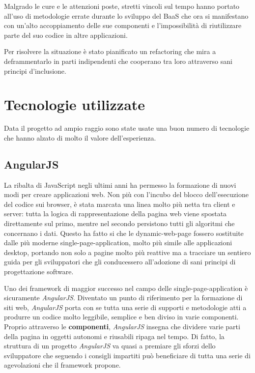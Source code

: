 Malgrado le cure e le attenzioni poste, stretti vincoli sul tempo hanno portato
all'uso di metodologie errate durante lo sviluppo del \gls{BaaS} che ora si
manifestano con un'alto accoppiamento delle sue componenti e l'impossibilità
di riutilizzare parte del suo codice in altre applicazioni.

Per risolvere la situazione è stato pianificato un \gls{refactoring} che mira
a deframmentarlo in parti indipendenti che cooperano tra loro attraverso
sani principi d'inclusione.

\section{Tecnologie utilizzate}
\label{sec:tecnologie}
Data il progetto ad ampio raggio sono state usate una buon numero di tecnologie
che hanno alzato di molto il valore dell'esperienza.

\subsection{AngularJS}
La ribalta di JavaScript negli ultimi anni ha permesso la formazione di
nuovi modi per creare applicazioni web. Non più con l'incubo del blocco
dell'esecuzione del codice sui browser, è stata marcata una linea molto più
netta tra client e server: tutta la logica di rappresentazione della pagina web
viene spostata direttamente sul primo, mentre nel secondo persistono tutti
gli algoritmi che concernano i dati. Questo ha fatto si che le
\gls{dynamic-web-page} fossero sostituite dalle più moderne
\gls{single-page-application}, molto più simile alle applicazioni desktop,
portando non solo a pagine molto più reattive ma a tracciare un sentiero guida
per gli sviluppatori che gli conducessero all'adozione di sani principi di
progettazione software.

Uno dei framework di maggior successo nel campo delle
\gls{single-page-application} è sicuramente \textit{AngularJS}. Diventato un
punto di riferimento per la formazione di siti web, \textit{AngularJS} porta
con se tutta una serie di supporti e metodologie atti a produrre un codice molto
leggibile, semplice e ben diviso in varie componenti. Proprio attraverso le
\textbf{componenti}, \textit{AngularJS} insegna che dividere varie parti della
pagina in oggetti autonomi e riusabili ripaga nel tempo. Di fatto, la struttura
di un progetto \textit{AngularJS} va quasi a premiare gli sforzi dello
sviluppatore che seguendo i consigli impartiti può beneficiare di tutta una
serie di agevolazioni che il framework propone.

